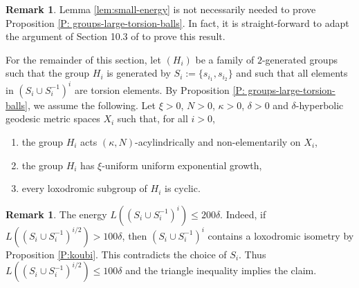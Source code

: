 \documentclass[leqno,a4paper,10pt]{amsart}
\theoremstyle{plain}
\theoremstyle{definition}
\newtheorem{ex}[thm]{Example}
\newtheorem{rem}[thm]{Remark}
\theoremstyle{remark}
\let\le\leqslant
\begin{document}
 \begin{rem} Lemma \ref{lem:small-energy} is not necessarily needed to prove Proposition \ref{P: groups-large-torsion-balls}. In fact, it is straight-forward to adapt the argument of Section 10.3 of \cite{coulon_product_2022}  to prove this result.  
 \end{rem}

For the remainder of this section, let $(H_i)$ be a family of $2$-generated groups  such that the group $H_i$ is generated by $S_i:=\{s_{i_1},s_{i_2}\}$ and such that all elements in $(S_i\cup S_{i}^{-1})^i$ are torsion elements. By Proposition \ref{P: groups-large-torsion-balls}, we assume the following. Let $\xi>0$, $N>0$, $\kappa>0$, $\delta>0$ and $\delta$-hyperbolic geodesic metric spaces $X_i$ such that, for all $i>0$, 
\begin{enumerate}
\item the group $H_i$ acts $(\kappa,N)$-acylindrically and non-elementarily on $X_i$, 
\item the group $H_i$ has $\xi$-uniform uniform exponential growth,
\item every loxodromic subgroup of $H_i$ is cyclic.  
\end{enumerate}

 \begin{rem}\label{R:energy-main-application} The energy $L((S_i\cup S_i^{-1})^i)\le 200 \delta$. Indeed, if $L((S_i\cup S_i^{-1})^{i/2})>100 \delta$, then $(S_i\cup S_i^{-1})^i$ contains a loxodromic isometry by Proposition \ref{P:koubi}. This contradicts the choice of $S_i$. Thus $L((S_i\cup S_i^{-1})^{i/2})\le 100 \delta$ and the triangle inequality implies the claim. 
\end{rem}



%
%
\end{document}
